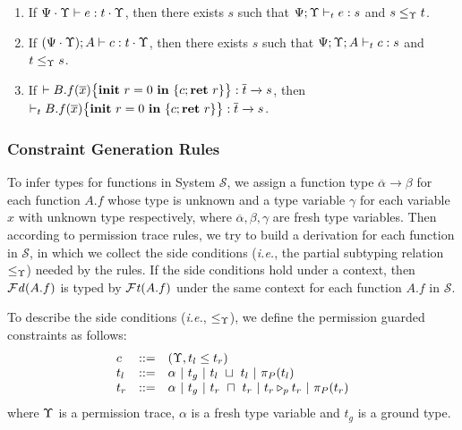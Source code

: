 {{{\begin{lemma}\label{lem:ptrcomplete}
{\myeqsize
\begin{enumerate}[label=(\alph*),topsep=1pt,itemsep=-1ex,partopsep=1ex,parsep=0ex]
\item\label{lem:ptrcomplete-1} If $\Psi\cdot\trace \vdash e : t\cdot \trace$, then there exists $s$ such that $\Psi;\trace \vdash_{t} e : s$ and $s \leq_{\trace} t$.
\item\label{lem:ptrcomplete-2} If $(\Psi\cdot\trace); A \vdash c : t\cdot \trace$, then there exists $s$ such that $\Psi;\trace;A \vdash_{t} c : s$ and $t \leq_{\trace} s$.
\item\label{lem:ptrcomplete-3} If $\vdash \lpPROG{B.f}{\overline{x}}{c}{\lpRES}  : \overline{t}\xrightarrow{} s$, then $\vdash_{t} \lpPROG{B.f}{\overline{x}}{c}{\lpRES}: \overline{t}\xrightarrow{} s$.
\end{enumerate}}
\end{lemma}


\subsubsection{\textbf{Constraint Generation Rules}}
To infer types for functions in System $\mathcal{S}$, we assign a function type $\overline{\alpha}\!\rightarrow\!\beta$ for each function $A.f$ whose type is unknown and a type variable $\gamma$ for each  variable $x$ with unknown type respectively, where $\overline{\alpha},\beta,\gamma$ are fresh type variables.
Then according to permission trace rules, we try to build a derivation for each function in $\mathcal{S}$, in which we collect the side conditions (\emph{i.e.}, the partial subtyping relation $\leq_{\trace}$) needed by the rules.
If the side conditions hold under a context, then $\FD(A.f)$ is typed by $\FT(A.f)$ under the same context for each function $A.f$ in $\mathcal{S}$.

To describe the side conditions (\emph{i.e.},  $\leq_{\trace}$), we define the permission guarded constraints as follows:
{\myeqsize\begin{equation*}
\begin{array}{lll}
c &::=& (\trace, t_l \leq t_r)\\
t_l &::=& \alpha~|~t_{g} ~ |~ t_l~\sqcup~t_l ~|~\app{t_l}{P}\\
t_r &::=&\alpha~|~t_{g} ~|~t_r~\sqcap~t_r ~|~\omerge{p}{t_r}{t_r}~|~\app{t_r}{P}\\
\end{array}
\end{equation*}}
where $\trace$ is a permission trace, $\alpha$ is a fresh type variable and $t_{g}$ is a ground type.

}}}
